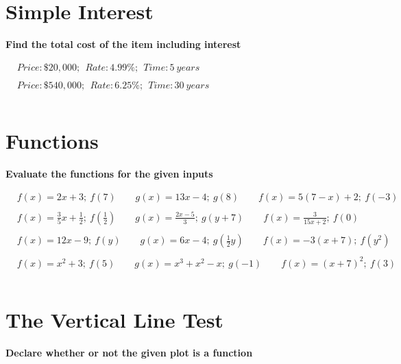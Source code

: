 \documentclass{article}
\begin{document}
\section{Simple Interest}
\bigskip
\textbf{Find the total cost of the item including interest}

\bigskip

\(\begin{aligned}
	&Price: \$20,000; \:\ Rate: 4.99\%;\:\ Time: 5\ years  \\\\
	&Price: \$540,000;\:\ Rate: 6.25\%;\:\ Time: 30\ years \\\\
\end{aligned}\)

\section{Functions}
\bigskip
\textbf{Evaluate the functions for the given inputs}
\bigskip

\(\begin{aligned}
	&f(x)=2x+3;\: f(7) \qquad g(x)=13x-4;\: g(8) \qquad f(x)=5(7-x)+2;\: f(-3)\\\\
	&f(x)=\frac{3}{5}x+\frac{1}{2};\: f(\frac{1}{2})\qquad g(x)=\frac{2x-5}{3};\: g(y+7) \qquad f(x)=\frac{3}{15x+2};\: f(0)\\\\
	&f(x)=12x-9; \:f(y) \qquad g(x)=6x-4; \:g(\frac{1}{2}y) \qquad f(x)=-3(x+7);\: f(y^2)\\\\
	&f(x)=x^2+3; \:f(5) \qquad g(x)=x^3+x^2-x;\: g(-1) \qquad f(x)=(x+7)^2;\: f(3)\\\\
\end{aligned}\)

\section{The Vertical Line Test}
\bigskip
\textbf{Declare whether or not the given plot is a function}
\end{document}

